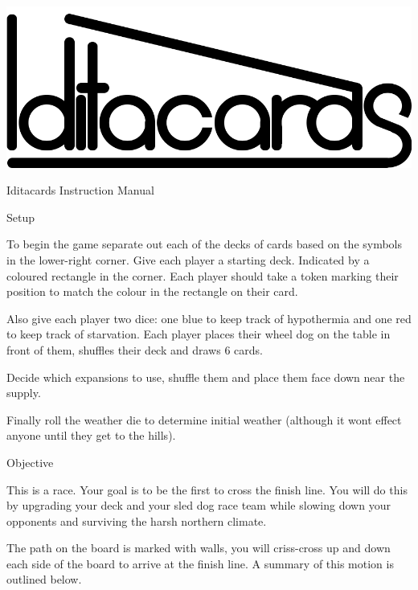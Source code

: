 \documentclass{article}
\begin{document}
\begin{titlepage}
\
\vfill
\centering
\includegraphics{iditacards}\par\vspace{5em}
{\Heading\LARGE Iditacards Instruction Manual\par}
\vfill
\end{titlepage}

{\noindent\Heading\Large Setup\par}

To begin the game separate out each of the decks of cards based on the
symbols in the lower-right corner. Give each player a starting deck. Indicated
by a coloured rectangle in the corner. Each player should take a token marking
their position to match the colour in the rectangle on their card.

Also give each player two dice: one blue to keep track of hypothermia and one
red to keep track of starvation. Each player places their wheel dog on the
table in front of them, shuffles their deck and draws 6 cards.

Decide which expansions to use, shuffle them and place them face down near
the supply.

Finally roll the weather die to determine initial weather (although it wont
effect anyone until they get to the hills).

\clearpage

{\noindent\Heading\Large Objective\par}

This is a race. Your goal is to be the first to cross the finish line. You will
do this by upgrading your deck and your sled dog race team while slowing down
your opponents and surviving the harsh northern climate.

The path on the board is marked with walls, you will criss-cross up and down
each side of the board to arrive at the finish line. A summary of this motion is
outlined below.
\end{document}
